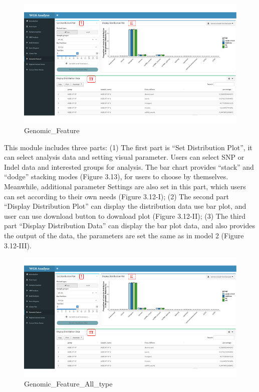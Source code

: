 \documentclass[
]{book}
\theoremstyle{definition}
\theoremstyle{definition}
\theoremstyle{definition}
\theoremstyle{definition}
\theoremstyle{remark}
\begin{document}
\begin{figure}
\includegraphics[width=1\linewidth]{figure/6.Genomic_Feature_1} \caption{Genomic_Feature}\label{fig:unnamed-chunk-17}
\end{figure}

This module includes three parts: (1) The first part is ``Set Distribution Plot'', it can select analysis data and setting visual parameter. Users can select SNP or Indel data and interested groups for analysis. The bar chart provides ``stack'' and ``dodge'' stacking modes (Figure 3.13), for users to choose by themselves. Meanwhile, additional parameter Settings are also set in this part, which users can set according to their own needs (Figure 3.12-I); (2) The second part ``Display Distribution Plot'' can display the distribution data use bar plot, and user can use download button to download plot (Figure 3.12-II); (3) The third part ``Display Distribution Data'' can display the bar plot data, and also provides the output of the data, the parameters are set the same as in model 2 (Figure 3.12-III).

\begin{figure}
\includegraphics[width=1\linewidth]{figure/6.Genomic_Feature_1} \caption{Genomic_Feature_All_type}\label{fig:unnamed-chunk-18}
\end{figure}
\end{document}
